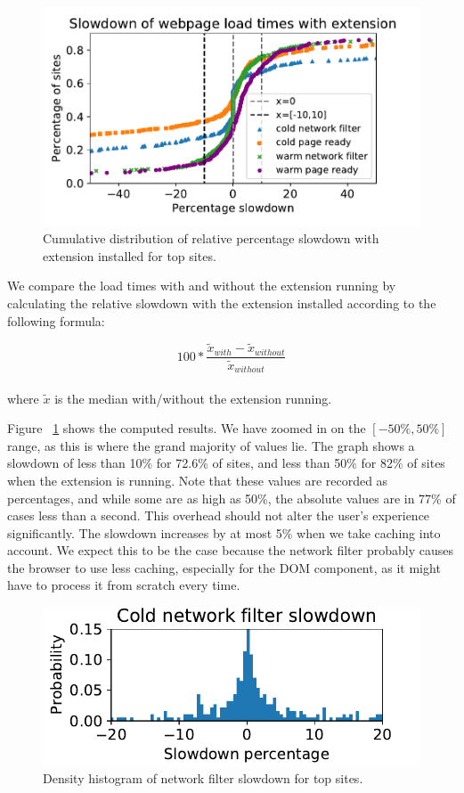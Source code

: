\begin{figure}[h]
	\includegraphics[scale=0.5]{results/extension_slowdown_overall_small.pdf}
	\caption{Cumulative distribution of relative percentage slowdown with extension installed for top sites.}
	\label{fig:overall_slowdown}
\end{figure}

We compare the load times with and without the extension running by calculating the relative slowdown with the extension installed according to the following formula: 

\begin{equation*}
100*\frac{\tilde{x}_{with}-\tilde{x}_{without}}{\tilde{x}_{without}}
\end{equation*}
\\
where $\tilde{x}$ is the median with/without the extension running.

Figure ~\ref{fig:overall_slowdown} shows the computed results. We have zoomed in on the $[-50\%,50\%]$ range, as this is where the grand majority of values lie. The graph shows a slowdown of less than 10\% for 72.6\% of sites, and less than 50\% for 82\% of sites when the extension is running. Note that these values are recorded as percentages, and while some are as high as 50\%, the absolute values are in 77\% of cases less than a second. This overhead should not alter the user's experience significantly. The slowdown increases by at most 5\% when we take caching into account. We expect this to be the case because the network filter probably causes the browser to use less caching, especially for the DOM component, as it might have to process it from scratch every time.

\begin{figure}[h]
	\includegraphics[scale=0.5]{results/density_histogram_filter_slowdown_small.pdf}
	\caption{Density histogram of network filter slowdown for top sites.}
	\label{fig:histogram_slowdown}
\end{figure}


